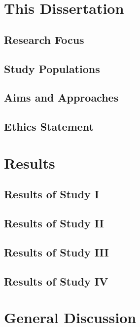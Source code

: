 \documentclass[
]{scrbook}
\begin{document}
\chapter{This Dissertation}\label{aims}

\section{Research Focus}\label{research-focus}

\section{Study Populations}\label{study-populations}

\section{Aims and Approaches}\label{aims-and-approaches}

\section{Ethics Statement}\label{ethics-statement}

\chapter{Results}\label{results}

\section{Results of Study I}\label{results-of-study-i}

\section{Results of Study II}\label{results-of-study-ii}

\section{Results of Study III}\label{results-of-study-iii}

\section{Results of Study IV}\label{results-of-study-iv}

\chapter{General Discussion}\label{discussion}
\end{document}

